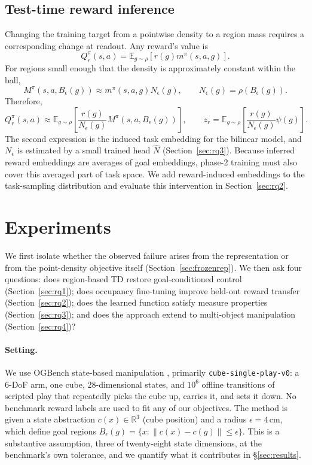 \documentclass{article}
\newcommand{\E}{\mathbb{E}}
\newcommand{\cube}{c}
\newcommand{\Nhat}{\hat N}
\begin{document}
\subsection{Test-time reward inference}
\label{sec:readout}

Changing the training target from a pointwise density to a region mass requires a corresponding change at readout.
Any reward's value is
\begin{equation}
Q_r^{\pi}(s,a)=\E_{g\sim\rho}[r(g)m^{\pi}(s,a,g)].
\end{equation}
For regions small enough that the density is approximately constant within the ball,
\begin{equation}
M^{\pi}(s,a,B_\epsilon(g))
\approx
m^{\pi}(s,a,g)N_\epsilon(g),
\qquad
N_\epsilon(g)=\rho(B_\epsilon(g)).
\end{equation}
Therefore,
\begin{equation}
\label{eq:readout}
Q_r^{\pi}(s,a)
\approx
\E_{g\sim\rho}\!\left[
\frac{r(g)}{N_\epsilon(g)}
M^{\pi}(s,a,B_\epsilon(g))
\right],
\qquad
z_r
=
\E_{g\sim\rho}\!\left[
\frac{r(g)}{N_\epsilon(g)}\psi(g)
\right].
\end{equation}
The second expression is the induced task embedding for the bilinear model, and $N_\epsilon$ is estimated by a small trained head $\Nhat$ (Section~\ref{sec:rq3}).
Because inferred reward embeddings are averages of goal embeddings, phase-2 training must also cover this averaged part of task space.
We add reward-induced embeddings to the task-sampling distribution and evaluate this intervention in Section~\ref{sec:rq2}.


\section{Experiments}
\label{sec:experiments}

We first isolate whether the observed failure arises from the representation or from the point-density objective itself (Section~\ref{sec:frozenrep}).
We then ask four questions: does region-based TD restore goal-conditioned control (Section~\ref{sec:rq1}); does occupancy fine-tuning improve held-out reward transfer (Section~\ref{sec:rq2}); does the learned function satisfy measure properties (Section~\ref{sec:rq3}); and does the approach extend to multi-object manipulation (Section~\ref{sec:rq4})?

\paragraph{Setting.}
We use OGBench state-based manipulation \citep{park2024ogbench}, primarily \texttt{cube-single-play-v0}: a $6$-DoF arm, one cube, $28$-dimensional states, and $10^6$ offline transitions of scripted play that repeatedly picks the cube up, carries it, and sets it down.
No benchmark reward labels are used to fit any of our objectives.
The method is given a state abstraction $\cube(x)\in\mathbb{R}^3$ (cube position) and a radius $\epsilon=4$\,cm, which define goal regions $B_\epsilon(g)=\{x:\|\cube(x)-\cube(g)\|\le\epsilon\}$.
This is a substantive assumption, three of twenty-eight state dimensions, at the benchmark's own tolerance, and we quantify what it contributes in \S\ref{sec:results}.
\end{document}
